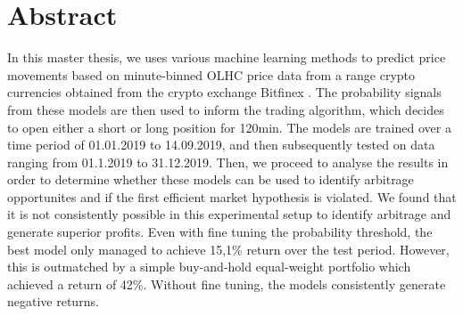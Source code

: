 \section*{Abstract}
\thispagestyle{empty}
In this master thesis, we uses various machine learning methods to predict price movements based on minute-binned OLHC price data
from a range crypto currencies obtained from the crypto exchange Bitfinex \cite{bitfinex2012}. 
The probability signals from these models are then used to inform the trading algorithm, 
which decides to open either a short or long position for 120min. The models are trained over a time period of 01.01.2019 to 14.09.2019, 
and then subsequently tested on data ranging from 01.1.2019 to 31.12.2019.
Then, we proceed to analyse the results in order to determine whether these models can be used to identify arbitrage opportunites
and if the first efficient market hypothesis is violated. 
We found that it is not consistently possible in this experimental setup to identify arbitrage and generate superior profits.
Even with fine tuning the probability threshold, the best model only managed to achieve 15,1\% return over the test period.
However, this is outmatched by a simple buy-and-hold equal-weight portfolio which achieved a return of 42\%.
Without fine tuning, the models consistently generate negative returns.
